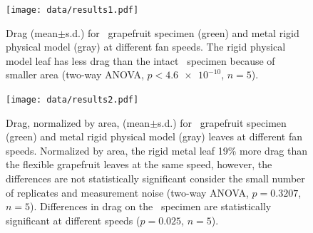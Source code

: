 \clearpage
\begin{figure}[p]
\begin{center}
\texttt{[image: data/results1.pdf]}
%
\end{center}
\caption{Drag (mean$\pm$s.d.) for \Cxparadisi\ grapefruit specimen (green) and metal rigid physical model (gray) at different fan speeds. The rigid physical model leaf has less drag than the intact \Cxparadisi\ specimen because of smaller area (two-way ANOVA, $p<\num{4.6e-10}$, $n=5$).}
\label{fig:results:drag}
\end{figure}

\begin{figure}[p]
\begin{center}
\texttt{[image: data/results2.pdf]}
%
\end{center}
\caption{Drag, normalized by area, (mean$\pm$s.d.) for \Cxparadisi\ grapefruit specimen (green) and metal rigid physical model (gray) leaves at different fan speeds. Normalized by area, the rigid metal leaf 19\% more drag than the flexible grapefruit leaves at the same speed, however, the differences are not statistically significant consider the small number of replicates and measurement noise (two-way ANOVA, $p=0.3207$, $n=5$). Differences in drag on the \Cxparadisi\ specimen are statistically significant at different speeds ($p=0.025$, $n=5$).}
\label{fig:results:dragarea}
\end{figure}

